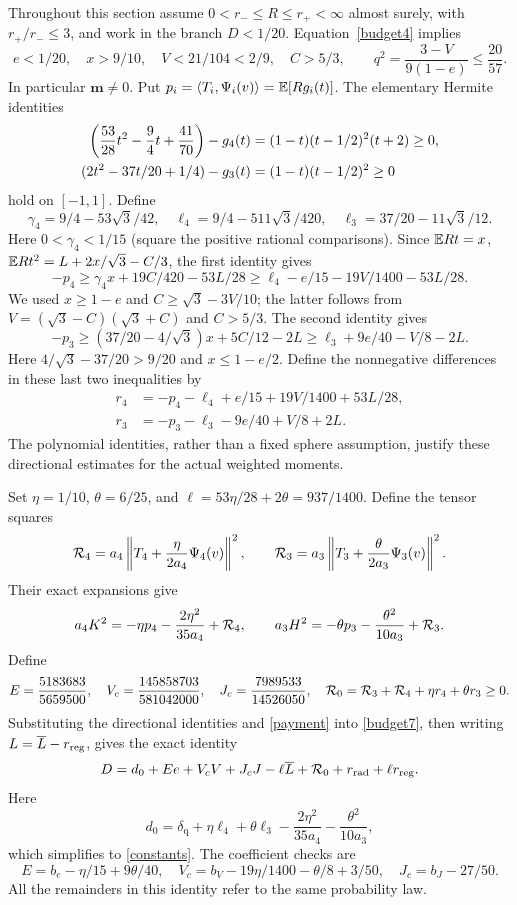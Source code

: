 Throughout this section assume $0<r_-\le R\le r_+<\infty$ almost surely,
with $r_+/r_-\le3$, and work in the branch $D<1/20$.
Equation~\eqref{budget4} implies
\begin{equation}\label{smallbranch}
 e<1/20,\quad x>9/10,\quad V<21/104<2/9,\quad C>5/3,
 \qquad q^2=\frac{3-V}{9(1-e)}\le\frac{20}{57}.
\end{equation}
In particular $\mathbf m\ne0$. Put $p_i=\langle T_i,\Psi_i(v)\rangle
=\mathbb E[Rg_i(t)]$. The elementary Hermite identities
\begin{align}\label{Hermite}
 \left(\frac{53}{28}t^2-\frac94t+\frac{41}{70}\right)-g_4(t)
       &=(1-t)(t-1/2)^2(t+2)\ge0,\notag\\
 (2t^2-37t/20+1/4)-g_3(t)
       &=(1-t)(t-1/2)^2\ge0
\end{align}
hold on $[-1,1]$. Define
\[
 \gamma_4=9/4-53\sqrt3/42,\quad
 \ell_4=9/4-511\sqrt3/420,\quad
 \ell_3=37/20-11\sqrt3/12.
\]
Here $0<\gamma_4<1/15$ (square the positive rational comparisons).
Since $\mathbb E Rt=x$, $\mathbb E Rt^2=L+2x/\sqrt3-C/3$, the first identity gives
\[
 -p_4\ge\gamma_4x+19C/420-53L/28
       \ge\ell_4-e/15-19V/1400-53L/28.
\]
We used $x\ge1-e$ and $C\ge\sqrt3-3V/10$; the latter follows from
$V=(\sqrt3-C)(\sqrt3+C)$ and $C>5/3$.
The second identity gives
\[
 -p_3\ge(37/20-4/\sqrt3)x+5C/12-2L
       \ge\ell_3+9e/40-V/8-2L.
\]
Here $4/\sqrt3-37/20>9/20$ and $x\le1-e/2$.
Define the nonnegative differences in these last two inequalities by
\begin{align*}
 r_4&=-p_4-\ell_4+e/15+19V/1400+53L/28,\\
 r_3&=-p_3-\ell_3-9e/40+V/8+2L.
\end{align*}
The polynomial identities, rather than a fixed sphere assumption,
justify these directional estimates for the actual weighted moments.

Set $\eta=1/10$, $\theta=6/25$, and
$\ell=53\eta/28+2\theta=937/1400$. Define the tensor squares
\[
 {\cal R}_4=a_4\left\|T_4+\frac{\eta}{2a_4}\Psi_4(v)\right\|^2,\qquad
 {\cal R}_3=a_3\left\|T_3+\frac{\theta}{2a_3}\Psi_3(v)\right\|^2.
\]
Their exact expansions give
\[
 a_4K^2=-\eta p_4-\frac{2\eta^2}{35a_4}+{\cal R}_4,\qquad
 a_3H^2=-\theta p_3-\frac{\theta^2}{10a_3}+{\cal R}_3.
\]
Define
\[
 E=\frac{5183683}{5659500},\quad
 V_c=\frac{145858703}{581042000},\quad
 J_c=\frac{7989533}{14526050},\quad
 {\cal R}_0={\cal R}_3+{\cal R}_4+\eta r_4+\theta r_3\ge0.
\]
Substituting the directional identities and \eqref{payment} into
\eqref{budget7}, then writing $L=\overline L-r_{\rm reg}$, gives the exact identity
\begin{equation}\label{certificate-start}
 D=d_0+E e+V_c V+J_c J-\ell\overline L
             +{\cal R}_0+r_{\rm rad}+\ell r_{\rm reg}.
\end{equation}
Here
\[
 d_0=\delta_{\mathrm q}+\eta\ell_4+\theta\ell_3
                 -\frac{2\eta^2}{35a_4}-\frac{\theta^2}{10a_3},
\]
which simplifies to \eqref{constants}. The coefficient checks are
\[
 E=b_e-\eta/15+9\theta/40,\quad
 V_c=b_V-19\eta/1400-\theta/8+3/50,\quad J_c=b_J-27/50.
\]
All the remainders in this identity refer to the same probability law.

